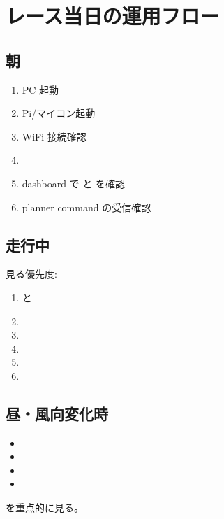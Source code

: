 \documentclass[a4paper,11pt]{article}
\begin{document}
\section{レース当日の運用フロー}

\subsection{朝}

\begin{enumerate}
  \item PC 起動
  \item Pi/マイコン起動
  \item WiFi 接続確認
  \item {}
  \item dashboard で  と  を確認
  \item planner command の受信確認
\end{enumerate}

\subsection{走行中}

見る優先度:

\begin{enumerate}
  \item {} と 
  \item {}
  \item {}
  \item {}
  \item {}
  \item {}
\end{enumerate}

\subsection{昼・風向変化時}

\begin{itemize}
  \item {}
  \item {}
  \item {}
  \item {}
\end{itemize}

を重点的に見る。
\end{document}
